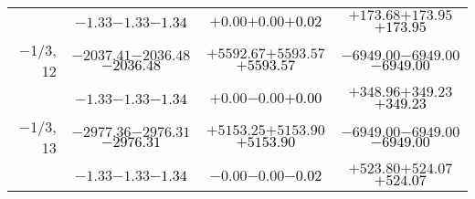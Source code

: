 \documentclass[compress]{beamer}
\begin{document}
\begin{frame}
{\begin{tabular}{r | c | c | c}
           & $-1.33$\hspace{0.1 cm}$-1.33$\hspace{0.1 cm}\textcolor{black}{$-1.34$} & $+0.00$\hspace{0.1 cm}$+0.00$\hspace{0.1 cm}\textcolor{black}{$+0.02$} & $+173.68$\hspace{0.1 cm}$+173.95$\hspace{0.1 cm}\textcolor{black}{$+173.95$} \\
$-$1/3, 12 & $-2037.41$\hspace{0.1 cm}$-2036.48$\hspace{0.1 cm}\textcolor{black}{$-2036.48$} & $+5592.67$\hspace{0.1 cm}$+5593.57$\hspace{0.1 cm}\textcolor{black}{$+5593.57$} & $-6949.00$\hspace{0.1 cm}$-6949.00$\hspace{0.1 cm}\textcolor{black}{$-6949.00$} \\
           & $-1.33$\hspace{0.1 cm}$-1.33$\hspace{0.1 cm}\textcolor{black}{$-1.34$} & $+0.00$\hspace{0.1 cm}$-0.00$\hspace{0.1 cm}\textcolor{black}{$+0.00$} & $+348.96$\hspace{0.1 cm}$+349.23$\hspace{0.1 cm}\textcolor{black}{$+349.23$} \\
$-$1/3, 13 & $-2977.36$\hspace{0.1 cm}$-2976.31$\hspace{0.1 cm}\textcolor{black}{$-2976.31$} & $+5153.25$\hspace{0.1 cm}$+5153.90$\hspace{0.1 cm}\textcolor{black}{$+5153.90$} & $-6949.00$\hspace{0.1 cm}$-6949.00$\hspace{0.1 cm}\textcolor{black}{$-6949.00$} \\
           & $-1.33$\hspace{0.1 cm}$-1.33$\hspace{0.1 cm}\textcolor{black}{$-1.34$} & $-0.00$\hspace{0.1 cm}$-0.00$\hspace{0.1 cm}\textcolor{black}{$-0.02$} & $+523.80$\hspace{0.1 cm}$+524.07$\hspace{0.1 cm}\textcolor{black}{$+524.07$} \\

\end{tabular}}
\end{frame}
\end{document}
